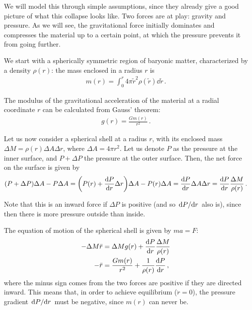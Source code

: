\documentclass[main.tex]{subfiles}
\begin{document}
We will model this through simple assumptions, since they already give a good picture of what this collapse looks like. Two forces are at play: gravity and pressure.
As we will see, the gravitational force initially dominates and compresses the material up to a certain point, at which the pressure prevents it from going further.

We start with a spherically symmetric region of baryonic matter, characterized by a density \(\rho (r)\): the mass enclosed in a radius \(r\) is 
%
\begin{align}
  m(r) = \int_{0}^{r} 4 \pi \widetilde{r}^2 \rho (\widetilde{r}) \dd{\widetilde{r}}
\,.
\end{align}

The modulus of the gravitational acceleration of the material at a radial coordinate \(r\) can be calculated from Gauss' theorem: 
%
\begin{align}
  g(r) = \frac{G m(r)}{r^2}
\,. 
\end{align}
%

Let us now consider a spherical shell at a radius \(r\), with its enclosed mass \(\Delta M = \rho (r) \Delta A \Delta r\), where \(\Delta A = 4 \pi r^2\).
Let us denote \(P\) as the pressure at the inner surface, and \(P + \Delta P\) the pressure at the outer surface. Then, the net force on the surface is given by
%
\begin{align}
\qty(P + \Delta P) \Delta A - P \Delta A 
= \qty(P(r) + \dv{P}{r}\Delta r) \Delta A - P(r) \Delta A 
= \dv{P}{r} \Delta A \Delta r
= \dv{P}{r} \frac{\Delta M}{\rho (r)}
\,.
\end{align}

Note that this is an inward force if \(\Delta P\) is positive (and so \(\dv*{P}{r}\) also is), since then there is more pressure outside than inside. 

The equation of motion of the spherical shell is given by \(ma = F\):
%
\begin{align}
  - \Delta M \ddot{r} &= \Delta M g(r) + \dv{P}{r} \frac{\Delta M}{\rho (r)} \\
  - \ddot{r} &= \frac{G m(r)}{r^2} + \frac{1}{\rho (r)} \dv{P}{r} 
\,,
\end{align}
%
where the minus sign comes from the two forces are positive if they are directed inward.
This means that, in order to achieve equilibrium (\(\ddot{r} = 0\)), the pressure gradient \(\dv*{P}{r} \) must be negative, since \(m(r)\) can never be.
\end{document}
